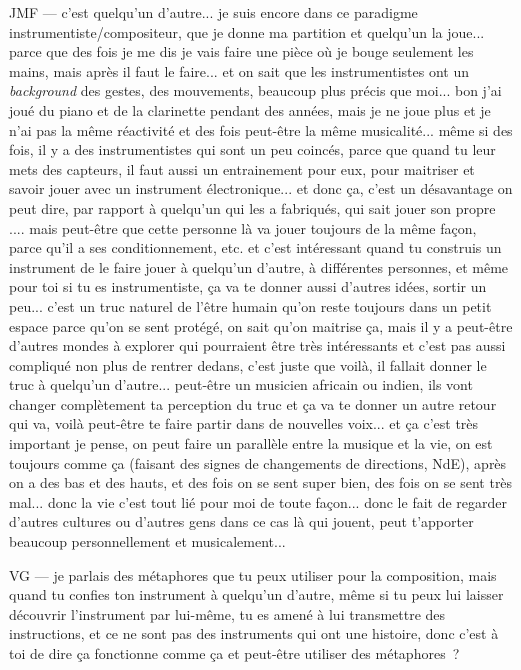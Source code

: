 JMF — c'est quelqu'un d'autre... je suis encore dans ce paradigme instrumentiste/compositeur, que je donne ma partition et quelqu'un la joue... parce que des fois je me dis je vais faire une pièce où je bouge seulement les mains, mais après il faut le faire... et on sait que les instrumentistes ont un \textit{background} des gestes, des mouvements, beaucoup plus précis que moi... bon j'ai joué du piano et de la clarinette pendant des années, mais je ne joue plus et je n'ai pas la même réactivité et des fois peut-être la même musicalité... même si des fois, il y a des instrumentistes qui sont un peu coincés, parce que quand tu leur mets des capteurs, il faut aussi un entrainement pour eux, pour maitriser et savoir jouer avec un instrument électronique... et donc ça, c'est un désavantage on peut dire, par rapport à quelqu'un qui les a fabriqués, qui sait jouer son propre .... mais peut-être que cette personne là va jouer toujours de la même façon, parce qu'il a ses conditionnement, etc. et c'est intéressant quand tu construis un instrument de le faire jouer à quelqu'un d'autre, à différentes personnes, et même pour toi si tu es instrumentiste, ça va te donner aussi d'autres idées, sortir un peu... c'est un truc naturel de l'être humain qu'on reste toujours dans un petit espace parce qu'on se sent protégé, on sait qu'on maitrise ça, mais il y a peut-être d'autres mondes à explorer qui pourraient être très intéressants et c'est pas aussi compliqué non plus de rentrer dedans, c'est juste que voilà, il fallait donner le truc à quelqu'un d'autre... peut-être un musicien africain ou indien, ils vont changer complètement ta perception du truc et ça va te donner un autre retour qui va, voilà peut-être te faire partir dans de nouvelles voix... et ça c'est très important je pense, on peut faire un parallèle entre la musique et la vie, on est toujours comme ça (faisant des signes de changements de directions, NdE), après on a des bas et des hauts, et des fois on se sent super bien, des fois on se sent très mal... donc la vie c'est tout lié pour moi de toute façon... donc le fait de regarder d'autres cultures ou d'autres gens dans ce cas là qui jouent, peut t'apporter beaucoup personnellement et musicalement...  

VG — je parlais des métaphores que tu peux utiliser pour la composition, mais quand tu confies ton instrument à quelqu'un d'autre, même si tu peux lui laisser découvrir l'instrument par lui-même, tu es amené à lui transmettre des instructions, et ce ne sont pas des instruments qui ont une histoire, donc c'est à toi de dire ça fonctionne comme ça et peut-être utiliser des métaphores ? 

